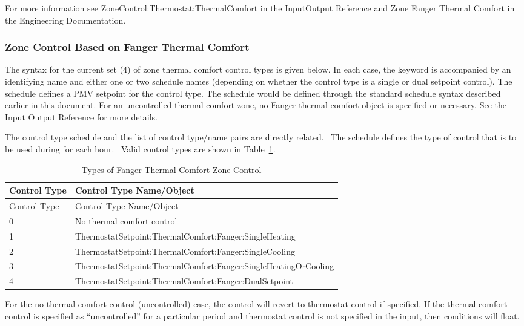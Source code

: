 For more information see ZoneControl:Thermostat:ThermalComfort in the InputOutput Reference and Zone Fanger Thermal Comfort in the Engineering Documentation.

\subsubsection{Zone Control Based on Fanger Thermal Comfort}\label{zone-control-based-on-fanger-thermal-comfort}

The syntax for the current set (4) of zone thermal comfort control types is given below. In each case, the keyword is accompanied by an identifying name and either one or two schedule names (depending on whether the control type is a single or dual setpoint control). The schedule defines a PMV setpoint for the control type. The schedule would be defined through the standard schedule syntax described earlier in this document. For an uncontrolled thermal comfort zone, no Fanger thermal comfort object is specified or necessary. See the Input Output Reference for more details.

The control type schedule and the list of control type/name pairs are directly related.~ The schedule defines the type of control that is to be used during for each hour.~ Valid control types are shown in Table~\ref{table:types-fanger-thermal-comfort-zone-control}.

\begin{longtable}[c]{p{1.0in}p{5.0in}}
\caption{Types of Fanger Thermal Comfort Zone Control \label{table:types-fanger-thermal-comfort-zone-control}} \tabularnewline
\toprule
Control Type & Control Type Name/Object \tabularnewline
\midrule
\endfirsthead

\toprule
Control Type & Control Type Name/Object \tabularnewline
\midrule
\endhead

0 & No thermal comfort control \tabularnewline
1 & ThermostatSetpoint:ThermalComfort:Fanger:SingleHeating \tabularnewline
2 & ThermostatSetpoint:ThermalComfort:Fanger:SingleCooling \tabularnewline
3 & ThermostatSetpoint:ThermalComfort:Fanger:SingleHeatingOrCooling \tabularnewline
4 & ThermostatSetpoint:ThermalComfort:Fanger:DualSetpoint \tabularnewline
\bottomrule
\end{longtable}

For the no thermal comfort control (uncontrolled) case, the control will revert to thermostat control if specified. If the thermal comfort control is specified as ``uncontrolled'' for a particular period and thermostat control is not specified in the input, then conditions will float.

